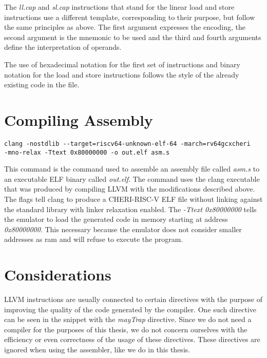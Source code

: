 The \textit{ll.cap} and \textit{sl.cap} instructions that stand for the linear load and store instructions use a different template, corresponding to their purpose, but follow the same principles as above. The first argument expresses the encoding, the second argument is the mnemonic to be used and the third and fourth arguments define the interpretation of operands.

The use of hexadecimal notation for the first set of instructions and binary notation for the load and store instructions follows the style of the already existing code in the file.

\section{Compiling Assembly}
\begin{verbatim}
clang -nostdlib --target=riscv64-unknown-elf-64 -march=rv64gcxcheri
-mno-relax -Ttext 0x80000000 -o out.elf asm.s
\end{verbatim}
This command is the command used to assemble an assembly file called \textit{asm.s} to an executable ELF binary called \textit{out.elf}. The command uses the clang executable that was produced by compiling LLVM with the modifications described above. The flags tell clang to produce a CHERI-RISC-V ELF file without linking against the standard library with linker relaxation enabled. The \textit{-Ttext 0x80000000} tells the emulator to load the generated code in memory starting at address \textit{0x80000000}. This necessary because the emulator does not consider smaller addresses as ram and will refuse to execute the program.

\section{Considerations}
LLVM instructions are usually connected to certain directives with the purpose of improving the quality of the code generated by the compiler. One such directive can be seen in the snippet with the \textit{mayTrap} directive. Since we do not need a compiler for the purposes of this thesis, we do not concern ourselves with the efficiency or even correctness of the usage of these directives. These directives are ignored when using the assembler, like we do in this thesis.
